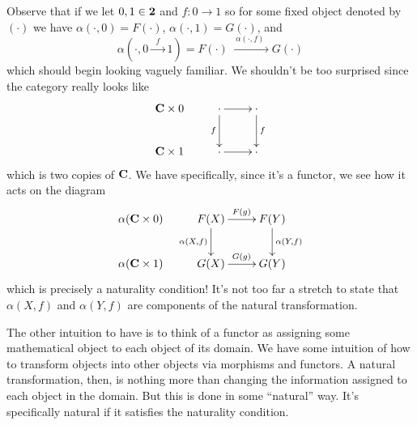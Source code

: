Observe that if we let $0,1\in\mathbf{2}$ and
$f:0\to{}1$ so for some fixed object denoted by $(\cdot)$ we have 
$\alpha(\cdot,0)=F(\cdot)$, $\alpha(\cdot,1)=G(\cdot)$, and
\begin{equation}
\alpha(\cdot,0\xrightarrow{\;\;f\;\;}1)=F(\cdot)\xrightarrow{\;\;\alpha(\cdot,f)\;\;}G(\cdot)
\end{equation}
which should begin looking vaguely familiar. We shouldn't be too
surprised since the category really looks like
\begin{equation}%
\vcenter{\xymatrix{
\ms{C}\times{}0 & \cdot\ar[d]_{f}\ar[r] & \cdot\ar[d]^{f} \\
\ms{C}\times{}1 & \cdot\ar[r] &\cdot
}}
\end{equation}
which is two copies of $\mathbf{C}$. We have specifically, since it's
a functor, we see how it acts on the diagram
\begin{equation}%
\vcenter{\xymatrix{
\alpha(\ms{C}\times{}0) & F(X)\ar[d]_{\alpha(X,f)}\ar[r]^{F(g)} & F(Y)\ar[d]^{\alpha(Y,f)} \\
\alpha(\ms{C}\times{}1) & G(X)\ar[r]^{G(g)} &G(Y)
}}
\end{equation}
which is precisely a naturality condition! It's not too far a
stretch to state that $\alpha(X,f)$ and $\alpha(Y,f)$ are
components of the natural transformation.
\begin{comment}
which should behave like a natural transformation. We just don't
know how $\alpha(X\xrightarrow{\;\;g\;\;}Y,f)$ behaves
exactly. We expect it to ``break up'' into three parts:
$\alpha(X,f)$, $\alpha(g,f)$, and $\alpha(Y,f)$. We suspect that
$\alpha(X,f)$ and $\alpha(Y,f)$ correspond to the components
$\alpha_X$ and $\alpha_Y$ of the natural transformation, but the
remaining bit $\alpha(g,f)$ remains a mystery. Intuitively, it
should either map $\alpha_X\to\alpha_Y$ or map $F(g)\to G(g)$. We
just don't have a good intuition of ``morphisms of morphisms''! 
\end{comment}

The other intuition to have is to think of a functor as assigning
some mathematical object to each object of its domain. We have
some intuition of how to transform objects into other objects via
morphisms and functors. A natural transformation, then, is
nothing more than changing the information assigned to each
object in the domain. But this is done in some ``natural''
way. It's specifically natural if it satisfies the naturality
condition.

